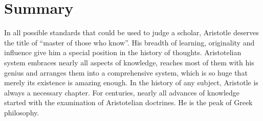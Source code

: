 \documentclass[11pt]{article}
\begin{document}
\section{Summary}
In all possible standards that could be used to judge a scholar, Aristotle deserves the title of “master of those who know”. 
His breadth of learning, originality and influence give him a special position in the history of thoughts. 
Aristotelian system embraces nearly all aspects of knowledge, reaches most of them with his genius and arranges them into a comprehensive system, which is so huge that merely its existence is amazing enough. 
In the history of any subject, Aristotle is always a necessary chapter. 
For centuries, nearly all advances of knowledge started with the examination of Aristotelian doctrines. 
He is the peak of Greek philosophy.
\end{document}
